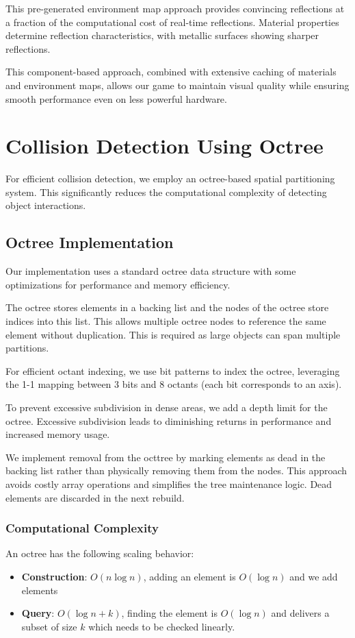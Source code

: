 \documentclass{article}
\begin{document}
This pre-generated environment map approach provides convincing reflections at a fraction of the computational cost of real-time reflections. Material properties determine reflection characteristics, with metallic surfaces showing sharper reflections.

This component-based approach, combined with extensive caching of materials and environment maps, allows our game to maintain visual quality while ensuring smooth performance even on less powerful hardware.

\section{Collision Detection Using Octree}

For efficient collision detection, we employ an octree-based spatial
partitioning system. This significantly reduces the computational complexity of
detecting object interactions.

\subsection{Octree Implementation}

Our implementation uses a standard octree data structure with some
optimizations for performance and memory efficiency.

The octree stores elements in a backing list and the nodes of the octree store
indices into this list. This allows multiple octree nodes to reference the same
element without duplication. This is required as large objects can span
multiple partitions.

For efficient octant indexing, we use bit patterns to index the octree,
leveraging the 1-1 mapping between 3 bits and 8 octants (each bit corresponds
to an axis).

To prevent excessive subdivision in dense areas, we add a depth limit for the
octree. Excessive subdivision leads to diminishing returns in performance and
increased memory usage.

We implement removal from the octtree by marking elements as dead in the
backing list rather than physically removing them from the nodes. This approach
avoids costly array operations and simplifies the tree maintenance logic. Dead
elements are discarded in the next rebuild.

\subsubsection{Computational Complexity}
An octree has the following scaling behavior:
\begin{itemize}
	\item \textbf{Construction}: $O(n \log n)$, adding an element is
		$O(\log n)$ and we add  elements

	\item \textbf{Query}: $O(\log n + k)$, finding the element is $O(\log n)$
		and delivers a subset of size $k$ which needs to be checked linearly.
\end{itemize}
\end{document}
